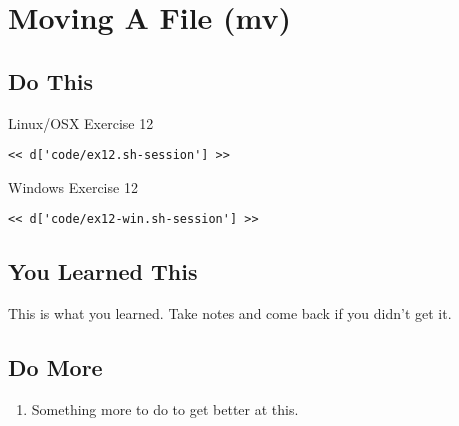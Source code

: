 \chapter{Moving A File (mv)}

\section{Do This}

\begin{code}{Linux/OSX Exercise 12}
\begin{Verbatim}
<< d['code/ex12.sh-session'] >>
\end{Verbatim}
\end{code}

\begin{code}{Windows Exercise 12}
\begin{Verbatim}
<< d['code/ex12-win.sh-session'] >>
\end{Verbatim}
\end{code}

\section{You Learned This}

This is what you learned.  Take notes and come back if you didn't get it.

\section{Do More}

\begin{enumerate}
\item Something more to do to get better at this.
\end{enumerate}

